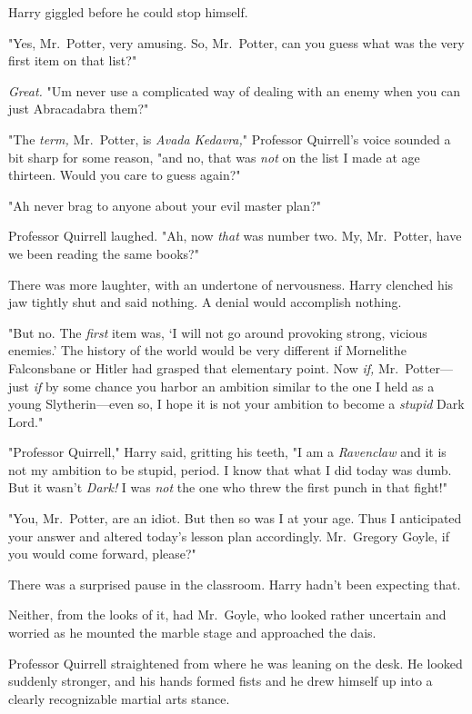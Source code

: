 Harry giggled before he could stop himself.

"Yes, Mr.~Potter, very amusing. So, Mr.~Potter, can you guess what was the very
first item on that list?"

\emph{Great.} "Um{\el} never use a complicated way of dealing with an enemy
when you can just Abracadabra them?"

"The \emph{term,} Mr.~Potter, is \emph{Avada Kedavra,}" Professor Quirrell's
voice sounded a bit sharp for some reason, "and no, that was \emph{not} on the
list I made at age thirteen. Would you care to guess again?"

"Ah{\el} never brag to anyone about your evil master plan?"

Professor Quirrell laughed. "Ah, now \emph{that} was number two. My,
Mr.~Potter, have we been reading the same books?"

There was more laughter, with an undertone of nervousness. Harry clenched his
jaw tightly shut and said nothing. A denial would accomplish nothing.

"But no. The \emph{first} item was, `I will not go around provoking strong,
vicious enemies.' The history of the world would be very different if
Mornelithe Falconsbane or Hitler had grasped that elementary point. Now
\emph{if,} Mr.~Potter---just \emph{if} by some chance you harbor an ambition
similar to the one I held as a young Slytherin---even so, I hope it is not your
ambition to become a \emph{stupid} Dark Lord."

"Professor Quirrell," Harry said, gritting his teeth, "I am a \emph{Ravenclaw}
and it is not my ambition to be stupid, period. I know that what I did today
was dumb. But it wasn't \emph{Dark!} I was \emph{not} the one who threw the
first punch in that fight!"

"You, Mr.~Potter, are an idiot. But then so was I at your age. Thus I
anticipated your answer and altered today's lesson plan accordingly.
Mr.~Gregory Goyle, if you would come forward, please?"

There was a surprised pause in the classroom. Harry hadn't been expecting that.

Neither, from the looks of it, had Mr.~Goyle, who looked rather uncertain and
worried as he mounted the marble stage and approached the dais.

Professor Quirrell straightened from where he was leaning on the desk. He
looked suddenly stronger, and his hands formed fists and he drew himself up
into a clearly recognizable martial arts stance.

